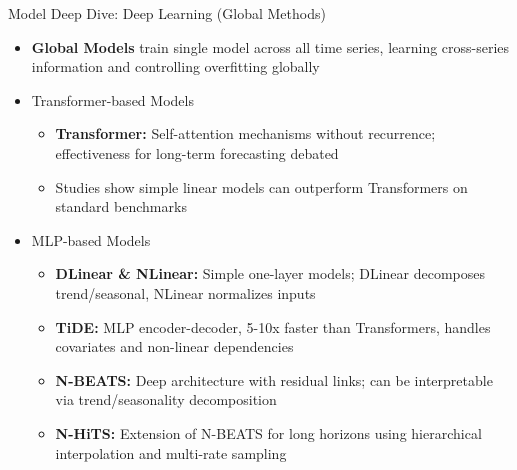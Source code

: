 \documentclass[ignorenonframetext, 9pt]{beamer}
\begin{document}
\begin{frame}{Model Deep Dive: Deep Learning (Global Methods)}
    \begin{itemize}
        \item \textbf{Global Models} train single model across all time series, learning cross-series information and controlling overfitting globally
        \vspace{0.3cm}
        \item \alert{Transformer-based Models}
        \begin{itemize}
            \item \textbf{Transformer:} Self-attention mechanisms without recurrence; effectiveness for long-term forecasting debated
            \vspace{0.2cm}
            \item Studies show simple linear models can outperform Transformers on standard benchmarks
        \end{itemize}
        \vspace{0.3cm}
        \item \alert{MLP-based Models}
        \begin{itemize}
            \item \textbf{DLinear \& NLinear:} Simple one-layer models; DLinear decomposes trend/seasonal, NLinear normalizes inputs
            \vspace{0.2cm}
            \item \textbf{TiDE:} MLP encoder-decoder, 5-10x faster than Transformers, handles covariates and non-linear dependencies
            \vspace{0.2cm}
            \item \textbf{N-BEATS:} Deep architecture with residual links; can be interpretable via trend/seasonality decomposition
            \vspace{0.2cm}
            \item \textbf{N-HiTS:} Extension of N-BEATS for long horizons using hierarchical interpolation and multi-rate sampling
        \end{itemize}
    \end{itemize}
\end{frame}
\end{document}
